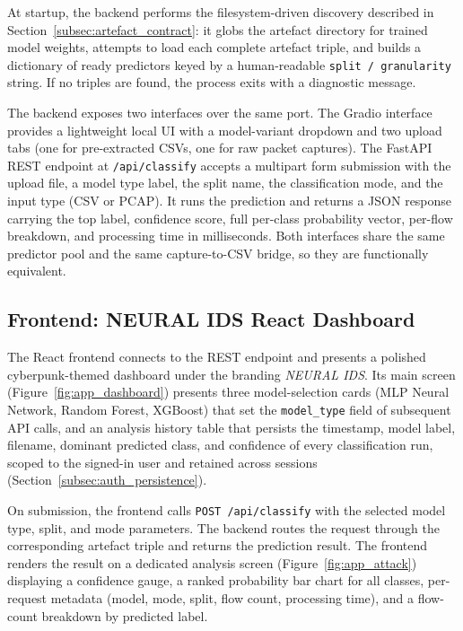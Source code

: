 \par At startup, the backend performs the filesystem-driven discovery described in Section~\ref{subsec:artefact_contract}: it globs the artefact directory for trained model weights, attempts to load each complete artefact triple, and builds a dictionary of ready predictors keyed by a human-readable \texttt{split / granularity} string. If no triples are found, the process exits with a diagnostic message.

\par The backend exposes two interfaces over the same port. The Gradio interface provides a lightweight local UI with a model-variant dropdown and two upload tabs (one for pre-extracted CSVs, one for raw packet captures). The FastAPI REST endpoint at \texttt{/api/classify} accepts a multipart form submission with the upload file, a model type label, the split name, the classification mode, and the input type (CSV or PCAP). It runs the prediction and returns a JSON response carrying the top label, confidence score, full per-class probability vector, per-flow breakdown, and processing time in milliseconds. Both interfaces share the same predictor pool and the same capture-to-CSV bridge, so they are functionally equivalent.

\subsection{Frontend: NEURAL IDS React Dashboard}
\label{subsec:frontend_react}

\par The React frontend connects to the REST endpoint and presents a polished cyberpunk-themed dashboard under the branding \emph{NEURAL IDS}. Its main screen (Figure~\ref{fig:app_dashboard}) presents three model-selection cards (MLP Neural Network, Random Forest, XGBoost) that set the \texttt{model\_type} field of subsequent API calls, and an analysis history table that persists the timestamp, model label, filename, dominant predicted class, and confidence of every classification run, scoped to the signed-in user and retained across sessions (Section~\ref{subsec:auth_persistence}).

\par On submission, the frontend calls \texttt{POST /api/classify} with the selected model type, split, and mode parameters. The backend routes the request through the corresponding artefact triple and returns the prediction result. The frontend renders the result on a dedicated analysis screen (Figure~\ref{fig:app_attack}) displaying a confidence gauge, a ranked probability bar chart for all classes, per-request metadata (model, mode, split, flow count, processing time), and a flow-count breakdown by predicted label.

